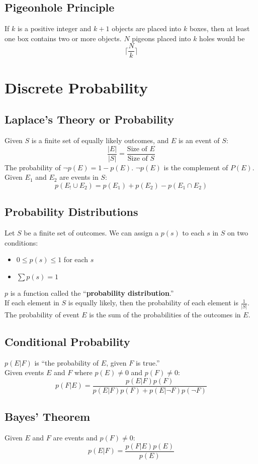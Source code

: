 \documentclass[letter]{article}
\begin{document}
\begin{multicols}{2}
	\subsection{Pigeonhole Principle}
	If $k$ is a positive integer and $k + 1$ objects are placed into $k$ boxes,
	then at least one box contains two or more objects. $N$ pigeons placed into
	$k$ holes would be
	$$\lceil\dfrac{N}{k}\rceil$$

	\section{Discrete Probability}
	\subsection{Laplace's Theory or Probability}
	Given $S$ is a finite set of equally likely outcomes, and $E$ is an event of
	$S$:
	$$\frac{|E|}{|S|} = \frac{\text{Size of } E}{\text{Size of } S}$$
	The probability of $\neg p(E) = 1 - p(E)$. $\neg p(E)$ is the complement of
	$P(E)$. \\
	Given $E_1$ and $E_2$ are events in $S$:
	$$p(E_! \cup E_2) = p(E_1) + p(E_2) - p(E_1 \cap E_2)$$
	\subsection{Probability Distributions}
	Let $S$ be a finite set of outcomes. We can assign a $p(s)$ to each $s$ in $S$
	on two conditions:
	\begin{itemize}
		\item $0 \leq p(s) \leq 1$ for each $s$
		\item $\sum{p(s)} = 1$
	\end{itemize}
	$p$ is a function called the ``\textbf{probability distribution}.'' \\
	If each element in $S$ is equally likely, then the probability of each element
	is $\frac{1}{|S|}$. \\
	The probability of event $E$ is the sum of the probabilities of the outcomes in
	$E$.
	\subsection{Conditional Probability}
	$p(E|F)$ is ``the probability of $E$, given $F$ is true.'' \\
	Given events $E$ and $F$ where $p(E) \neq 0$ and $p(F) \neq 0$:
	$$p(F|E) = \frac{p(E|F)p(F)}{p(E|F)p(F) + p(E|\neg F)p(\neg F)}$$
	\subsection{Bayes' Theorem}
	Given $E$ and $F$ are events and $p(F) \neq 0$:
	$$p(E|F) = \frac{p(F|E)p(E)}{p(E)}$$

\end{multicols}
\end{document}
